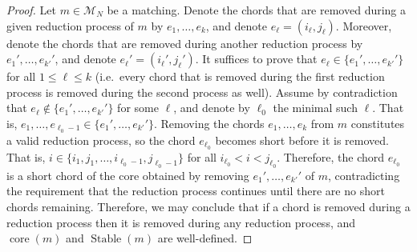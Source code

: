 \documentclass[11pt]{article}
\theoremstyle{definition}
\providecommand{\ie}{i.e.\ }
\numberwithin{equation}{section}
\newcommand{\Stable}{\operatorname{Stable}}
\newcommand{\core}{\operatorname{core}}
\newcommand{\M}{\mathcal{M}}
\begin{document}
\begin{proof}
    Let $m \in \M_N$ be a matching. Denote the chords that are removed during a given reduction process of $m$ by $e_1, \dots, e_k$, and denote $e_\ell = (i_\ell,j_\ell)$. Moreover, denote the chords that are removed during another reduction process by $e_1', \dots, e_{k'}'$, and denote $e_\ell' = (i_\ell',j_\ell')$. It suffices to prove that $e_\ell \in \{e_1', \dots, e_{k'}'\}$ for all $1 \le \ell \le k$ (\ie every chord that is removed during the first reduction process is removed during the second process as well). Assume by contradiction that $e_\ell \notin \{e_1', \dots, e_{k'}'\}$ for some $\ell$, and denote by $\ell_0$ the minimal such $\ell$.
    That is, $e_1,\dots,e_{\ell_0-1} \in \{e_1', \dots, e_{k'}'\}$. Removing the chords $e_1, \dots, e_k$ from $m$ constitutes a valid reduction process, so the chord $e_{\ell_0}$ becomes short before it is removed. That is, $i \in \{i_1,j_1,\dots,i_{\ell_0-1},j_{\ell_0-1}\}$ for all $i_{\ell_0} < i < j_{\ell_0}$. Therefore, the chord $e_{\ell_0}$ is a short chord of the core obtained by removing $e_1', \dots, e_{k'}'$ of $m$, contradicting the requirement that the reduction process continues until there are no short chords remaining. Therefore, we may conclude that if a chord is removed during a reduction process then it is removed during any reduction process, and $\core(m)$ and $\Stable(m)$ are well-defined.
\end{proof}
\end{document}
